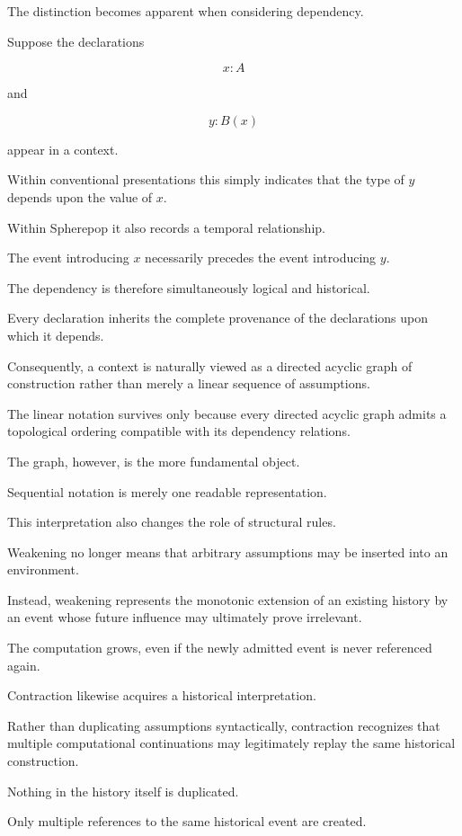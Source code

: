 \documentclass[12pt,oneside]{article}
\theoremstyle{definition}
\theoremstyle{remark}
\begin{document}
The distinction becomes apparent when considering dependency.

Suppose the declarations

\[
x:A
\]

and

\[
y:B(x)
\]

appear in a context.

Within conventional presentations this simply indicates that the type of
\(y\) depends upon the value of \(x\).

Within Spherepop it also records a temporal relationship.

The event introducing \(x\) necessarily precedes the event introducing
\(y\).

The dependency is therefore simultaneously logical and historical.

Every declaration inherits the complete provenance of the declarations upon
which it depends.

Consequently, a context is naturally viewed as a directed acyclic graph of
construction rather than merely a linear sequence of assumptions.

The linear notation survives only because every directed acyclic graph admits
a topological ordering compatible with its dependency relations.

The graph, however, is the more fundamental object.

Sequential notation is merely one readable representation.

This interpretation also changes the role of structural rules.

Weakening no longer means that arbitrary assumptions may be inserted into an
environment.

Instead, weakening represents the monotonic extension of an existing history by
an event whose future influence may ultimately prove irrelevant.

The computation grows, even if the newly admitted event is never referenced
again.

Contraction likewise acquires a historical interpretation.

Rather than duplicating assumptions syntactically, contraction recognizes that
multiple computational continuations may legitimately replay the same
historical construction.

Nothing in the history itself is duplicated.

Only multiple references to the same historical event are created.
\end{document}
